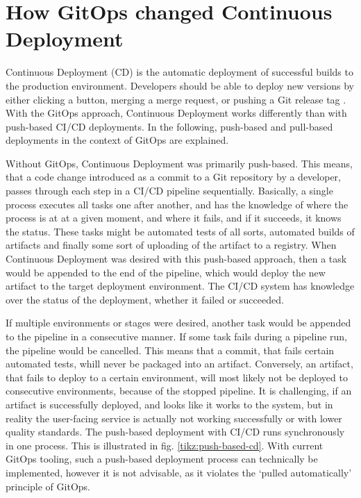 \section{How GitOps changed Continuous Deployment}
\label{theoretical-background:gitops-cd}

Continuous Deployment (CD) is the automatic deployment of successful builds to the production environment.
Developers should be able to deploy new versions by either clicking a button, merging a merge request, or pushing a Git release tag
\autocite{cloudNativeDevopsMitKubernetesArundel2019cloud}.
With the GitOps approach,
Continuous Deployment works differently than with push-based CI/CD deployments.
In the following,
push-based and pull-based deployments in the context of GitOps are explained.


Without GitOps, Continuous Deployment was primarily push-based.
This means, that a code change introduced as a commit to a Git repository by a developer,
passes through each step in a CI/CD pipeline sequentially.
Basically, a single process executes all tasks one after another,
and has the knowledge of where the process is at at a given moment,
and where it fails, and if it succeeds, it knows the status.
These tasks might be automated tests of all sorts,
automated builds of artifacts and finally some sort of uploading of the artifact to a registry.
When Continuous Deployment was desired with this push-based approach,
then a task would be appended to the end of the pipeline,
which would deploy the new artifact to the target deployment environment.
The CI/CD system has knowledge over the status of the deployment, whether it failed or succeeded.

If multiple environments or stages were desired,
another task would be appended to the pipeline
in a consecutive manner.
If some task fails during a pipeline run,
the pipeline would be cancelled.
This means that a commit, that fails certain automated tests,
whill never be packaged into an artifact.
Conversely, an artifact, that fails to deploy to a certain environment,
will most likely not be deployed to consecutive environments, because of the stopped pipeline.
It is challenging, if an artifact is successfully deployed,
and looks like it works to the system,
but in reality the user-facing service is actually not working successfully or with lower quality standards.
The push-based deployment with CI/CD runs synchronously in one process.
This is illustrated in fig. \ref{tikz:push-based-cd}.
With current GitOps tooling,
such a push-based deployment process can technically be implemented,
however it is not advisable, as it violates the \enquote*{pulled automatically} principle of GitOps.


